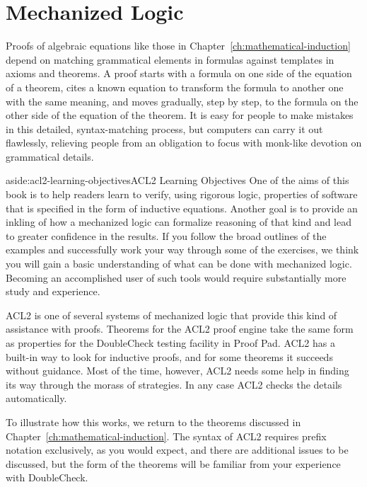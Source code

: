 \chapter{Mechanized Logic}
\label{ch:mechanized-logic}

Proofs of algebraic equations
like those in Chapter~\ref{ch:mathematical-induction}
depend on matching grammatical elements in formulas
against templates in axioms and theorems.
A proof starts with a formula on one side
of the equation of a theorem,
cites a known equation to transform the formula
to another one with the same meaning,
and moves gradually, step by step, to the formula
on the other side of the equation of the theorem.
It is easy for people to make mistakes
in this detailed, syntax-matching process,
but computers can carry it out flawlessly,
relieving people from an obligation to focus
with monk-like devotion on grammatical details.

\begin{aside}{aside:acl2-learning-objectives}{ACL2 Learning Objectives}
One of the aims of this book is to help readers learn to
verify, using rigorous logic, properties of software
that is specified in the form of inductive equations.
Another goal is to provide
an inkling of how a mechanized logic
can formalize reasoning of that kind
and lead to greater confidence in the results.
If you follow the broad outlines of the examples
and successfully work your way through some of the exercises,
we think you will gain a basic understanding
of what can be done with mechanized logic.
Becoming an accomplished user of such tools
would require substantially more study and experience.
\end{aside}

ACL2 is one of several systems of
mechanized logic
that provide this kind of assistance with proofs.
Theorems for the ACL2 proof engine take the same form
as properties for the DoubleCheck testing facility in Proof Pad.
ACL2 has a built-in way to look for inductive proofs,
and for some theorems it succeeds without guidance.
Most of the time, however, ACL2 needs some help in
finding its way through the morass of strategies.
In any case ACL2 checks the details automatically.

To illustrate how this works, we return to the theorems
discussed in Chapter~\ref{ch:mathematical-induction}.
The syntax of ACL2 requires prefix notation exclusively,
as you would expect, and there are additional issues
to be discussed, but the form of the theorems
will be familiar from your experience with DoubleCheck.


